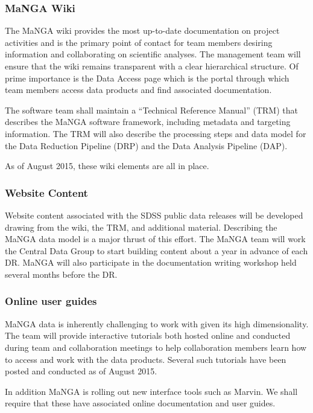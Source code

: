 \documentclass[preprint,11pt]{aastex}
\begin{document}
\subsubsection{MaNGA Wiki}

The MaNGA wiki provides the most up-to-date documentation on project activities and is the primary point of contact for team
members desiring information and collaborating on scientific analyses.  The management team will ensure that the wiki remains
transparent with a clear hierarchical structure.  Of prime importance is the Data Access page which is the portal through which
team members access data products and find associated documentation.

The software team shall maintain a ``Technical Reference Manual'' (TRM) that describes the MaNGA software framework, including metadata
and targeting information.  The TRM will also describe the processing
steps and data model for the Data Reduction Pipeline (DRP) and the Data
Analysis Pipeline (DAP).  

As of August 2015, these wiki elements are all in place.

\subsubsection{Website Content}

Website content associated with the SDSS public data releases will be developed drawing from the wiki, the TRM, and
additional material.  Describing the MaNGA data model is a major thrust of this effort.  The MaNGA team will work the Central Data Group to start building content about a year in advance of each
DR.  MaNGA will also participate in the documentation writing workshop held several months before the DR.

\subsubsection{Online user guides}

MaNGA data is inherently challenging to work with given its high dimensionality.  The team will provide interactive tutorials
both hosted online and conducted during team and collaboration meetings to help collaboration members learn how to access and work
with the data products.  Several such tutorials have been posted and conducted as of August 2015.

In addition MaNGA is rolling out new interface tools such as Marvin.  We shall require that these have associated online
documentation and user guides.
\end{document}

